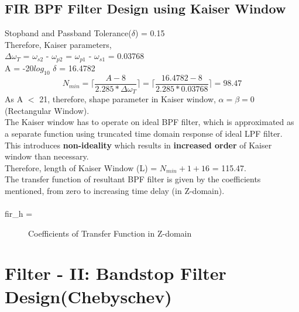 \documentclass[12pt]{article}
\begin{document}
\subsection{FIR BPF Filter Design using Kaiser Window}
Stopband and Passband Tolerance($\delta$) = 0.15\\
Therefore, Kaiser parameters,\\
$\Delta\omega_T$ = $\omega_{s2}$ - $\omega_{p2}$ = $\omega_{p1}$ - $\omega_{s1}$ = 0.03768\\
A = -20$log_{10}$ $\delta$ = 16.4782\\
\begin{equation}
    N_{min} = \lceil\frac{A - 8}{2.285*\Delta\omega_T}\rceil = \lceil\frac{16.4782 - 8}{2.285*0.03768}\rceil = 98.47 
\end{equation}
As A $<$ 21, therefore, shape parameter in Kaiser window, $\alpha = \beta = 0$ (Rectangular Window).\\
The Kaiser window has to operate on ideal BPF filter, which is approximated as a separate function using truncated time domain response of ideal LPF filter. This introduces {\bf non-ideality} which results in {\bf increased order} of Kaiser window than necessary.\\
Therefore, length of Kaiser Window (L) = $N_{min} + 1 + 16$ = 115.47.\\
The transfer function of resultant BPF filter is given by the coefficients mentioned, from zero to increasing time delay (in Z-domain).
\\
\\
fir\_h =


\begin{figure}[H]
    \caption{Coefficients of Transfer Function in Z-domain}
\end{figure}

\newpage



\section{Filter - II: Bandstop Filter Design(Chebyschev) }
\end{document}
